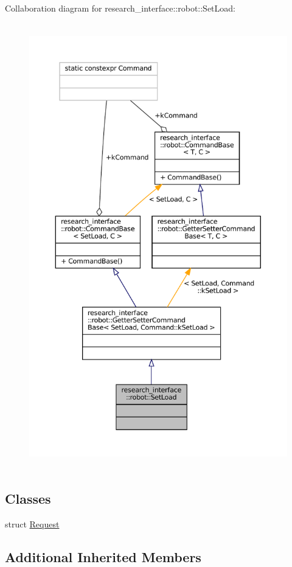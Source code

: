 Collaboration diagram for research\+\_\+interface\+:\+:robot\+:\+:Set\+Load\+:
\nopagebreak
\begin{figure}[H]
\begin{center}
\leavevmode
\includegraphics[height=550pt]{structresearch__interface_1_1robot_1_1SetLoad__coll__graph}
\end{center}
\end{figure}
\subsection*{Classes}
\begin{DoxyCompactItemize}
\item 
struct \hyperlink{structresearch__interface_1_1robot_1_1SetLoad_1_1Request}{Request}
\end{DoxyCompactItemize}
\subsection*{Additional Inherited Members}


